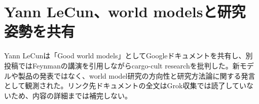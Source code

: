 \section{Yann LeCun、world modelsと研究姿勢を共有}
Yann LeCunは「Good world models」としてGoogleドキュメントを共有し、別投稿ではFeynmanの講演を引用しながらcargo-cult researchを批判した。新モデルや製品の発表ではなく、world model研究の方向性と研究方法論に関する発言として観測された。リンク先ドキュメントの全文はGrok収集では読了していないため、内容の詳細までは補完しない。
